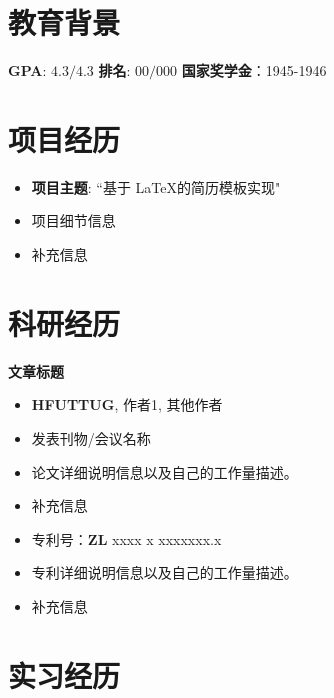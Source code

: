 \documentclass{resume}
\begin{document}
\vspace{0.5cm}

\section{教育背景}


\textbf{GPA}: $4.3 / 4.3$ \quad 
\textbf{排名}: $00 / 000 $ \quad
\textbf{国家奖学金}：1945-1946


\section{项目经历}

\begin{itemize}[parsep=0.5ex]
    \item \textbf{项目主题}: ``基于 \LaTeX 的简历模板实现" 
    \item 项目细节信息
    \item 补充信息
\end{itemize}


\section{科研经历}

\textbf{文章标题}
\begin{itemize}[parsep=0.5ex]
    \item \textbf{HFUTTUG}, 作者1, 其他作者
    \item 发表刊物/会议名称
    \item 论文详细说明信息以及自己的工作量描述。
    \item 补充信息
\end{itemize}

\begin{itemize}[parsep=0.5ex]
    \item 专利号：\textbf{ZL }xxxx x xxxxxxx.x
    \item 专利详细说明信息以及自己的工作量描述。
    \item 补充信息
\end{itemize}

\section{实习经历}
\end{document}
